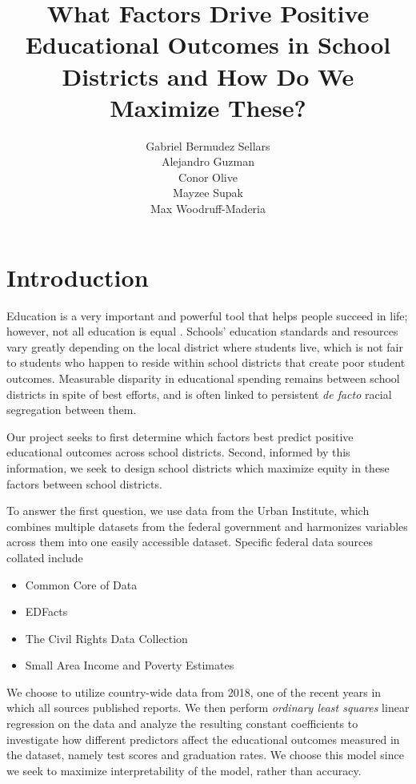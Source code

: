 \documentclass{article}
\title{What Factors Drive Positive Educational Outcomes in School Districts and How Do We Maximize These?}
\author{Gabriel Bermudez Sellars\\Alejandro Guzman\\Conor Olive\\Mayzee Supak\\Max Woodruff-Maderia}
\date{}
\begin{document}
\maketitle

\tableofcontents

\section{Introduction}

Education is a very important and powerful tool that helps people succeed in life; however, not all education is equal \autocite{doi:10.1177/0013124519833442}. Schools’ education standards and resources vary greatly depending on the local district where students live, which is not fair to students who happen to reside within school districts that create poor student outcomes. Measurable disparity in educational spending remains between school districts in spite of best efforts, and is often linked to persistent \textit{de facto} racial segregation\autocite{kitchens2021} between them.

Our project seeks to first determine which factors best predict positive educational outcomes across school districts. Second, informed by this information, we seek to design school districts which maximize equity in these factors between school districts.

To answer the first question, we use data from the Urban Institute\autocite{urban}, which combines multiple datasets\autocite{urbansources} from the federal government and harmonizes variables across them into one easily accessible dataset. Specific federal data sources collated include
\begin{itemize}
    \item Common Core of Data
    \item EDFacts
    \item The Civil Rights Data Collection
    \item Small Area Income and Poverty Estimates
\end{itemize}
We choose to utilize country-wide data from 2018, one of the recent years in which all sources published reports. We then perform \textit{ordinary least squares} linear regression on the data and analyze the resulting constant coefficients to investigate how different predictors affect the educational outcomes measured in the dataset, namely test scores and graduation rates. We choose this model since we seek to maximize interpretability of the model, rather than accuracy.
\end{document}
